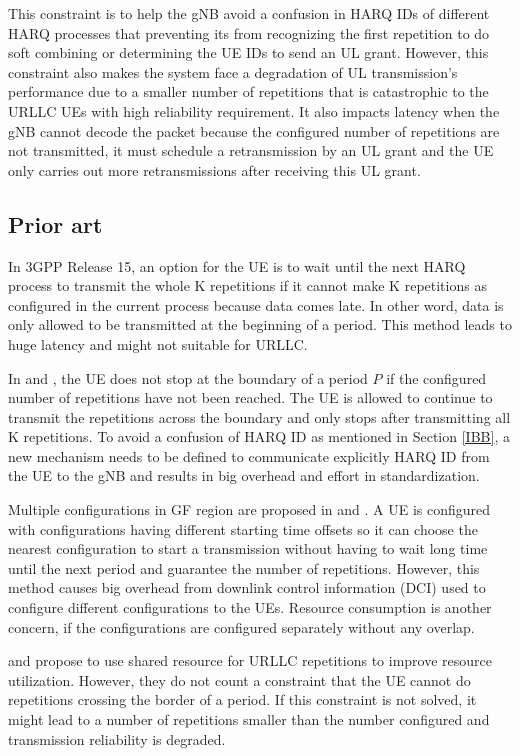 \documentclass[conference]{IEEEtran}
\begin{document}
This constraint is to help the gNB avoid a confusion in HARQ IDs of different HARQ processes that preventing its from recognizing the first repetition to do soft combining or determining the UE IDs to send an UL grant. However, this constraint also makes the system face a degradation of UL transmission's performance due to a smaller number of repetitions that is catastrophic to the URLLC UEs with high reliability requirement. It also impacts latency when the gNB cannot decode the packet because the configured number of repetitions are not transmitted, it must schedule a retransmission by an UL grant and the UE only carries out more retransmissions after receiving this UL grant.

\subsection{Prior art}\label{ICC}
In 3GPP Release 15, an option for the UE is to wait until the next HARQ process to transmit the whole K repetitions if it cannot make K repetitions as configured in the current process because data comes late. In other word, data is only allowed to be transmitted at the beginning of a period. This method leads to huge latency and might not suitable for URLLC.

In \cite{b1} and \cite{b2}, the UE does not stop at the boundary of a period $P$ if the configured number of repetitions have not been reached. The UE is allowed to continue to transmit the repetitions across the boundary and only stops after transmitting all K repetitions. To avoid a confusion of HARQ ID as mentioned in Section \ref{IBB}, a new mechanism needs to be defined to communicate explicitly HARQ ID from the UE to the gNB and results in big overhead and effort in standardization.  

Multiple configurations in GF region are proposed in \cite{b3} and \cite{b4}. A UE is configured with configurations having different starting time offsets so it can choose the nearest configuration to start a transmission without having to wait long time until the next period and guarantee the number of repetitions. However, this method causes big overhead from downlink control information (DCI) used to configure different configurations to the UEs. Resource consumption is another concern, if the configurations are configured separately without any overlap. 

\cite{b5} and \cite{b7} propose to use shared resource for URLLC repetitions to improve resource utilization. However, they do not count a constraint that the UE cannot do repetitions crossing the border of a period. If this constraint is not solved, it might lead to a number of repetitions smaller than the  number configured and transmission reliability is degraded.
\end{document}
